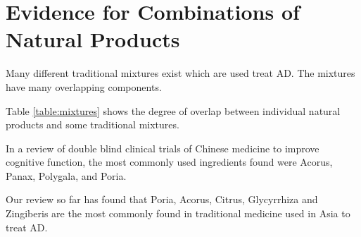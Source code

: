 \documentclass[twocolumn]{article}
\begin{document}
\section{Evidence for Combinations of Natural Products}

Many different traditional mixtures exist which are used
treat AD. The mixtures have many overlapping components.

Table \ref{table:mixtures} shows the degree of overlap between
individual natural products and some traditional mixtures.


In a review of double blind clinical trials of
Chinese medicine to improve cognitive function,
the most commonly used ingredients found were
Acorus,
Panax,
Polygala,
and Poria.

Our review so far has found that Poria, Acorus,
Citrus, Glycyrrhiza and Zingiberis are the most commonly
found in traditional medicine used in Asia to treat AD.
\end{document}
